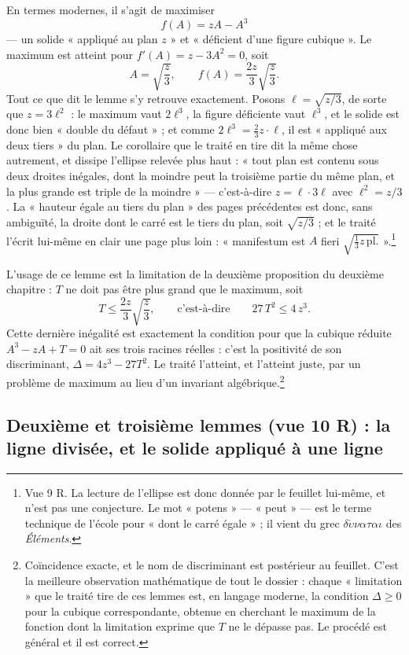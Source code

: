 \documentclass[11pt,a4paper]{article}
\begin{document}
En termes modernes, il s'agit de maximiser
\[ f(A) = zA - A^3 \]
— un solide « appliqué au plan $z$ » et « déficient d'une figure cubique ». Le
maximum est atteint pour $f'(A) = z - 3A^2 = 0$, soit
\[ A = \sqrt{\frac{z}{3}}, \qquad f(A) = \frac{2z}{3}\sqrt{\frac{z}{3}}. \]
Tout ce que dit le lemme s'y retrouve exactement. Posons
$\ell = \sqrt{z/3}$, de sorte que $z = 3\ell^2$ : le maximum vaut $2\ell^3$, la
figure déficiente vaut $\ell^3$, et le solide est donc bien « double du
défaut » ; et comme $2\ell^3 = \tfrac23 z \cdot \ell$, il est « appliqué aux
deux tiers » du plan. Le corollaire que le traité en tire dit la même chose
autrement, et dissipe l'ellipse relevée plus haut : « tout plan est contenu sous
deux droites inégales, dont la moindre peut la troisième partie du même plan, et
la plus grande est triple de la moindre » — c'est-à-dire $z = \ell \cdot 3\ell$
avec $\ell^2 = z/3$. La « hauteur égale au tiers du plan » des pages précédentes
est donc, sans ambiguïté, la droite dont le carré est le tiers du plan, soit
$\sqrt{z/3}$ ; et le traité l'écrit lui-même en clair une page plus loin :
« manifestum est $A$ fieri $\sqrt{\tfrac13 z\,\mathrm{pl.}}$ ».\footnote{Vue 9 R.
La lecture de l'ellipse est donc donnée par le feuillet lui-même, et n'est pas
une conjecture. Le mot « potens » — « peut » — est le terme technique de l'école
pour « dont le carré égale » ; il vient du grec $\delta\acute{\upsilon}\nu\alpha\tau\alpha\iota$
des \emph{Éléments}.}

L'usage de ce lemme est la limitation de la deuxième proposition du deuxième
chapitre : $T$ ne doit pas être plus grand que le maximum, soit
\[ T \le \frac{2z}{3}\sqrt{\frac{z}{3}}, \qquad \text{c'est-à-dire} \qquad 27\,T^2 \le 4\,z^3. \]
Cette dernière inégalité est exactement la condition pour que la cubique réduite
$A^3 - zA + T = 0$ ait ses trois racines réelles : c'est la positivité de son
discriminant, $\Delta = 4z^3 - 27T^2$. Le traité l'atteint, et l'atteint juste,
par un problème de maximum au lieu d'un invariant
algébrique.\footnote{Coïncidence exacte, et le nom de discriminant est
postérieur au feuillet. C'est la meilleure observation mathématique de tout le
dossier : chaque « limitation » que le traité tire de ces lemmes est, en langage
moderne, la condition $\Delta \ge 0$ pour la cubique correspondante, obtenue en
cherchant le maximum de la fonction dont la limitation exprime que $T$ ne le
dépasse pas. Le procédé est général et il est correct.}

\subsection*{Deuxième et troisième lemmes (vue 10 R) : la ligne divisée, et le solide appliqué à une ligne}
\end{document}
